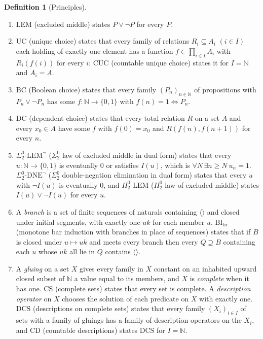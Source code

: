 \documentclass{lmcs}
\theoremstyle{definition}
\newtheorem{definition}[theorem]{Definition}
\theoremstyle{remark}
\newcommand{\Nn}{\mathbb{N}}
\newcommand{\prin}[1]{\mathrm{#1}}
\newcommand{\EM}{\prin{LEM}}
\newcommand{\UC}{\prin{UC}}
\newcommand{\EIO}{\Sigma^0_2\text{-}\prin{LEM}^{\neg}}
\newcommand{\CD}{\prin{CD}}
\providecommand{\SDNE}{\Sigma^0_2\text{-}\prin{DNE}^{\neg}}
\providecommand{\PLEM}{\Pi^0_2\text{-}\prin{LEM}}
\providecommand{\CUC}{\prin{CUC}}
\providecommand{\BC}{\prin{BC}}
\providecommand{\DC}{\prin{DC}}
\providecommand{\BIb}{\prin{BI}_{\mathrm{br}}}
\providecommand{\CS}{\prin{CS}}
\providecommand{\DCS}{\prin{DCS}}
\providecommand{\CUC}{\prin{CUC}}
\providecommand{\BC}{\prin{BC}}
\providecommand{\SDNE}{\Sigma^0_2\text{-}\prin{DNE}^{\neg}}
\providecommand{\PLEM}{\Pi^0_2\text{-}\prin{LEM}}
\begin{document}
\begin{definition}[Principles]\label{def:em-uc}\label{def:eio}\label{def:sdne}\label{def:cuc-bc}\label{def:setup-bibr}\label{def:setup-cd}\label{def:setup-split}
\begin{enumerate}
\item $\EM$ (excluded middle) states $P\vee\neg P$ for every $P$.
\item $\UC$ (unique choice) states that every family of relations $R_i\subseteq A_i$ $(i\in I)$ each holding of exactly one
  element has a function $f\in\prod_{i\in I}A_i$ with $R_i(f(i))$ for every $i$; $\CUC$ (countable unique choice) states it for $I=\Nn$
  and $A_i=A$.
\item $\BC$ (Boolean choice) states that every family $(P_n)_{n\in\Nn}$ of propositions with $P_n\vee\neg P_n$ has some
  $f\colon\Nn\to\{0,1\}$ with $f(n)=1\iff P_n$.
\item $\DC$ (dependent choice) states that every total relation $R$ on a set $A$ and every $x_0\in A$ have some $f$ with $f(0)=x_0$
  and $R(f(n),f(n+1))$ for every $n$.
\item $\EIO$ ($\Sigma^0_2$ law of excluded middle in dual form) states that every $u\colon\Nn\to\{0,1\}$ is eventually $0$
  or satisfies $I(u)$, which is $\forall N\,\exists n\geq N\ u_n=1$. $\SDNE$ ($\Sigma^0_2$ double-negation elimination in dual form) states
  that every $u$ with $\neg I(u)$ is eventually $0$, and $\PLEM$ ($\Pi^0_2$ law of excluded
  middle) states $I(u)\vee\neg I(u)$ for every $u$.
\item A \emph{branch} is a set of finite sequences of naturals containing $\langle\rangle$ and closed under
  initial segments, with exactly one $uk$ for each member $u$. $\BIb$ (monotone bar induction
  with branches in place of sequences) states that if $B$ is closed under
  $u\mapsto uk$ and meets every branch then every $Q\supseteq B$ containing each $u$ whose $uk$ all lie in $Q$
  contains $\langle\rangle$.
\item A \emph{gluing} on a set $X$ gives every family in $X$ constant on an inhabited upward closed subset of $\Nn$ a
  value equal to its members, and $X$ is \emph{complete} when it has one. $\CS$ (complete sets)
  states that every set is complete. A \emph{description operator} on $X$ chooses the
  solution of each predicate on $X$ with exactly one. $\DCS$ (descriptions on complete sets)
  states that every family $(X_i)_{i\in I}$ of sets with a family of gluings has a family of description operators
  on the $X_i$, and $\CD$ (countable descriptions) states $\DCS$ for
  $I=\Nn$.
\end{enumerate}
\end{definition}
\end{document}
